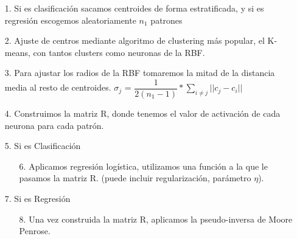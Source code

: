 \begin{itemize}
	\item[1.] Si es clasificación sacamos centroides de forma estratificada, y si es regresión escogemos aleatoriamente $n_1$ patrones
	\item[2.] Ajuste de centros mediante algoritmo de clustering más popular, el K-means, con tantos clusters como neuronas de la RBF.
	\item[3.] Para ajustar los radios de la RBF tomaremos la mitad de la distancia media al resto de centroides. $\sigma_j$ = $\dfrac{1}{2(n_1-1)} * \sum_{i\neq j} \lvert\lvert c_j-c_i \rvert\rvert$
	\item[4.] Construimos la matriz R, donde tenemos el valor de activación de cada neurona para cada patrón.
	\item[5.] Si es Clasificación
	\begin{itemize}
		\item[6.] Aplicamos regresión logística, utilizamos una función a la que le pasamos la matriz R. (puede incluir regularización, parámetro $\eta$).
	\end{itemize}
	\item[7.] Si es Regresión
	\begin{itemize}
		\item[8.] Una vez construida la matriz R, aplicamos la pseudo-inversa de Moore Penrose.
	\end{itemize}
\end{itemize}



